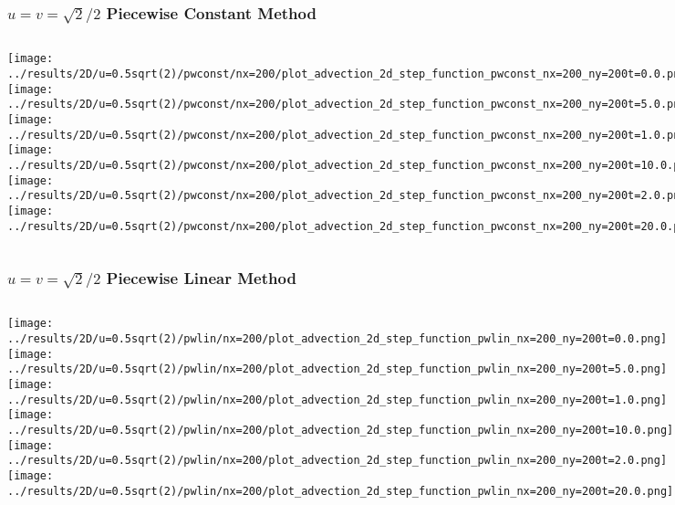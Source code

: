 \begin{frame}
	\frametitle{$u = v = \sqrt{2}/2$ Piecewise Constant Method}
	\begin{columns}
		\centering
		\texttt{[image: ../results/2D/u=0.5sqrt(2)/pwconst/nx=200/plot\_advection\_2d\_step\_function\_pwconst\_nx=200\_ny=200t=0.0.png]}\\
		\texttt{[image: ../results/2D/u=0.5sqrt(2)/pwconst/nx=200/plot\_advection\_2d\_step\_function\_pwconst\_nx=200\_ny=200t=5.0.png]}
		\centering
		\texttt{[image: ../results/2D/u=0.5sqrt(2)/pwconst/nx=200/plot\_advection\_2d\_step\_function\_pwconst\_nx=200\_ny=200t=1.0.png]}\\
		\texttt{[image: ../results/2D/u=0.5sqrt(2)/pwconst/nx=200/plot\_advection\_2d\_step\_function\_pwconst\_nx=200\_ny=200t=10.0.png]}
		\centering
		\texttt{[image: ../results/2D/u=0.5sqrt(2)/pwconst/nx=200/plot\_advection\_2d\_step\_function\_pwconst\_nx=200\_ny=200t=2.0.png]}\\
		\texttt{[image: ../results/2D/u=0.5sqrt(2)/pwconst/nx=200/plot\_advection\_2d\_step\_function\_pwconst\_nx=200\_ny=200t=20.0.png]}
	\end{columns}
\end{frame}


\begin{frame}
	\frametitle{$u = v = \sqrt{2}/2$ Piecewise Linear Method}
	\begin{columns}
		\column{.33\textwidth}
			\centering
			\texttt{[image: ../results/2D/u=0.5sqrt(2)/pwlin/nx=200/plot\_advection\_2d\_step\_function\_pwlin\_nx=200\_ny=200t=0.0.png]}\\
			\texttt{[image: ../results/2D/u=0.5sqrt(2)/pwlin/nx=200/plot\_advection\_2d\_step\_function\_pwlin\_nx=200\_ny=200t=5.0.png]}
		\column{.33\textwidth}
			\centering
			\texttt{[image: ../results/2D/u=0.5sqrt(2)/pwlin/nx=200/plot\_advection\_2d\_step\_function\_pwlin\_nx=200\_ny=200t=1.0.png]}\\
			\texttt{[image: ../results/2D/u=0.5sqrt(2)/pwlin/nx=200/plot\_advection\_2d\_step\_function\_pwlin\_nx=200\_ny=200t=10.0.png]}
		\column{.33\textwidth}
			\centering
			\texttt{[image: ../results/2D/u=0.5sqrt(2)/pwlin/nx=200/plot\_advection\_2d\_step\_function\_pwlin\_nx=200\_ny=200t=2.0.png]}\\
			\texttt{[image: ../results/2D/u=0.5sqrt(2)/pwlin/nx=200/plot\_advection\_2d\_step\_function\_pwlin\_nx=200\_ny=200t=20.0.png]}
	\end{columns}
\end{frame}


